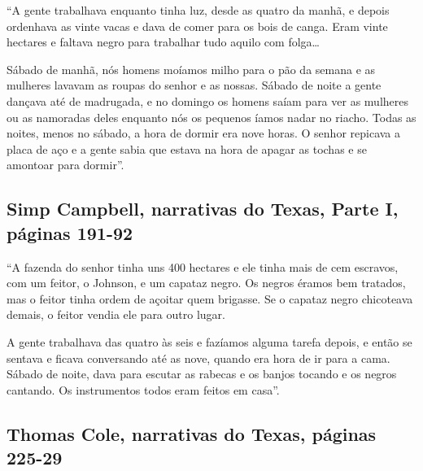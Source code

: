 ``A gente trabalhava enquanto tinha luz, desde as quatro da manhã, e
depois ordenhava as vinte vacas e dava de comer para os bois de canga.
Eram vinte hectares e faltava negro para trabalhar tudo aquilo com
folga\ldots{}

Sábado de manhã, nós homens moíamos milho para o pão da semana e as
mulheres lavavam as roupas do senhor e as nossas. Sábado de noite a
gente dançava até de madrugada, e no domingo os homens saíam para ver as
mulheres ou as namoradas deles enquanto nós os pequenos íamos nadar no
riacho. Todas as noites, menos no sábado, a hora de dormir era nove
horas. O senhor repicava a placa de aço e a gente sabia que estava na
hora de apagar as tochas e se amontoar para dormir''.

\subsection{Simp Campbell, narrativas do Texas, Parte I, páginas 191-92} \label{ref44}

``A fazenda do senhor tinha uns 400 hectares e ele tinha mais de cem
escravos, com um feitor, o Johnson, e um capataz negro. Os negros éramos
bem tratados, mas o feitor tinha ordem de açoitar quem brigasse. Se o
capataz negro chicoteava demais, o feitor vendia ele para outro lugar.

A gente trabalhava das quatro às seis e fazíamos alguma tarefa depois, e
então se sentava e ficava conversando até as nove, quando era hora de ir
para a cama. Sábado de noite, dava para escutar as rabecas e os banjos
tocando e os negros cantando. Os instrumentos todos eram feitos em
casa''.

\subsection{Thomas Cole, narrativas do Texas, páginas 225-29} \label{ref55}

